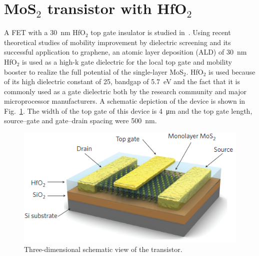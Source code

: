 \documentclass[12pt,a4paper,titlepage]{article}
\begin{document}
\section{MoS$_2$ transistor with HfO$_2$}
A FET with a \SI{30}{\nano \meter} HfO$_2$ top gate insulator is studied in~\cite{Radisavljevic:Si_MoS2}. Using recent theoretical studies of mobility improvement by dielectric screening and its successful application to graphene, an atomic layer deposition (ALD) of \SI{30}{\nano \meter} HfO$_2$ is used as a high-k gate dielectric for the
local top gate and mobility booster to realize the full potential of the single-layer MoS$_2$. HfO$_2$ is used because of its high dielectric constant of 25, bandgap of \SI{5.7}{\electronvolt} and the fact that it is commonly used as a gate dielectric both by the research community and major microprocessor manufacturers. A schematic depiction of the device is shown in Fig.~\ref{fig:HfO2_fabrication}. The width of the top gate of this device is \SI{4}{\micro \meter} and the top gate length, source–gate and gate–drain spacing were \SI{500}{\nano \meter}.

\begin{figure}[h]
	\centering
	\includegraphics[width=.8\textwidth]{Immagini/HfO2_fabrication.png} 
	\caption{Three-dimensional schematic view of the transistor.~\cite{Radisavljevic:Si_MoS2}}
	\label{fig:HfO2_fabrication}
\end{figure} 
\end{document}

